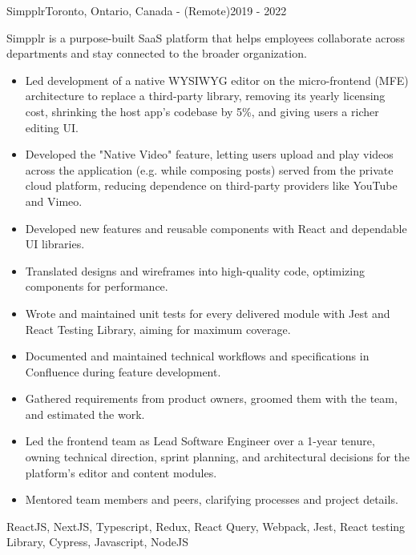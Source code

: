 \begin{projects}
    \newpage
    \project
    {Simpplr}{Toronto, Ontario, Canada - (Remote)}{2019 - 2022}
    {}
    {Simpplr is a purpose-built SaaS platform that helps employees collaborate across departments and stay connected to the broader organization.
    \begin{itemize}
        \item Led development of a native WYSIWYG editor on the micro-frontend (MFE) architecture to replace a third-party library, removing its yearly licensing cost, shrinking the host app's codebase by 5\%, and giving users a richer editing UI.
        \item Developed the "Native Video" feature, letting users upload and play videos across the application (e.g. while composing posts) served from the private cloud platform, reducing dependence on third-party providers like YouTube and Vimeo.
        \item Developed new features and reusable components with React and dependable UI libraries.
        \item Translated designs and wireframes into high-quality code, optimizing components for performance.
        \item Wrote and maintained unit tests for every delivered module with Jest and React Testing Library, aiming for maximum coverage.
        \item Documented and maintained technical workflows and specifications in Confluence during feature development.
        \item Gathered requirements from product owners, groomed them with the team, and estimated the work.
        \item Led the frontend team as Lead Software Engineer over a 1-year tenure, owning technical direction, sprint planning, and architectural decisions for the platform's editor and content modules.
        \item Mentored team members and peers, clarifying processes and project details.
    \end{itemize}}
    {ReactJS, NextJS, Typescript, Redux, React Query, Webpack, Jest, React testing Library, Cypress, Javascript, NodeJS}


\end{projects}
